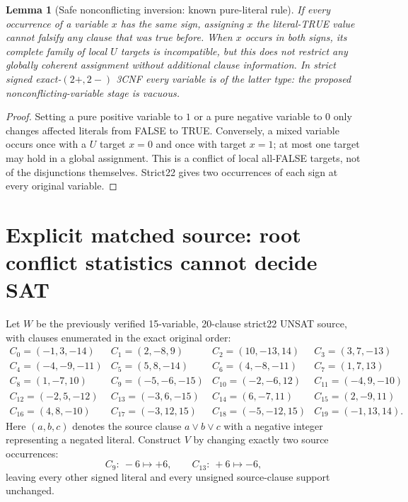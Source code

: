 \documentclass[10pt]{article}
\newtheorem{lemma}{Lemma}
\begin{document}
\begin{lemma}[Safe nonconflicting inversion: known pure-literal rule]
If every occurrence of a variable $x$ has the same sign, assigning $x$ the literal-TRUE value cannot falsify any clause that was true before. When $x$ occurs in both signs, its complete family of local $U$ targets is incompatible, but this does not restrict any globally coherent assignment without additional clause information. In strict signed exact-$(2+,2-)$ 3CNF \emph{every} variable is of the latter type: the proposed nonconflicting-variable stage is vacuous.
\end{lemma}
\begin{proof}
Setting a pure positive variable to $1$ or a pure negative variable to $0$ only changes affected literals from FALSE to TRUE. Conversely, a mixed variable occurs once with a $U$ target $x=0$ and once with target $x=1$; at most one target may hold in a global assignment. This is a conflict of local all-FALSE targets, not of the disjunctions themselves. Strict22 gives two occurrences of each sign at every original variable.\end{proof}

\section*{Explicit matched source: root conflict statistics cannot decide SAT}
Let $W$ be the previously verified 15-variable, 20-clause strict22 UNSAT source, with clauses enumerated in the exact original order:
\begin{equation*}\begin{array}{llll}
C_0=(-1,3,-14)&C_1=(2,-8,9)&C_2=(10,-13,14)&C_3=(3,7,-13)\\
C_4=(-4,-9,-11)&C_5=(5,8,-14)&C_6=(4,-8,-11)&C_7=(1,7,13)\\
C_8=(1,-7,10)&C_9=(-5,-6,-15)&C_{10}=(-2,-6,12)&C_{11}=(-4,9,-10)\\
C_{12}=(-2,5,-12)&C_{13}=(-3,6,-15)&C_{14}=(6,-7,11)&C_{15}=(2,-9,11)\\
C_{16}=(4,8,-10)&C_{17}=(-3,12,15)&C_{18}=(-5,-12,15)&C_{19}=(-1,13,14).
\end{array}\end{equation*}
Here $(a,b,c)$ denotes the source clause $a\vee b\vee c$ with a negative integer representing a negated literal. Construct $V$ by changing exactly two source occurrences:
\[
 C_9:\ -6\mapsto+6,\qquad C_{13}:\ +6\mapsto-6,
\]
leaving every other signed literal and every unsigned source-clause support unchanged.
\end{document}

